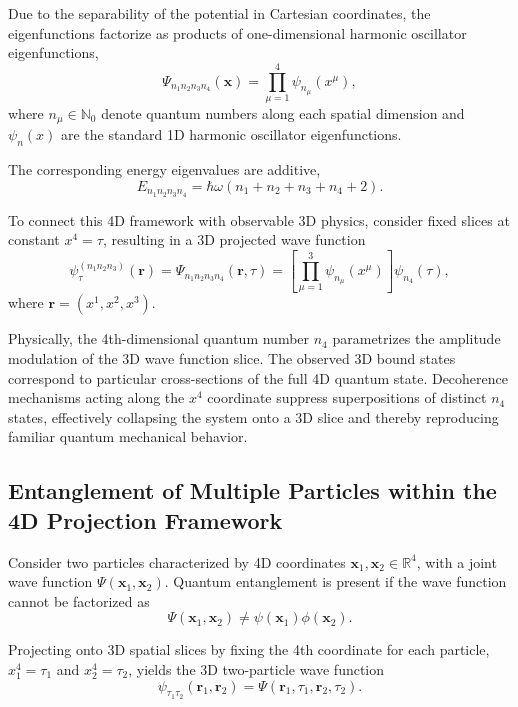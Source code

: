 \documentclass[12pt,a4paper]{article}
\numberwithin{equation}{section}
\begin{document}
Due to the separability of the potential in Cartesian coordinates, the eigenfunctions factorize as products of one-dimensional harmonic oscillator eigenfunctions,
\begin{equation}
    \Psi_{n_1 n_2 n_3 n_4}(\mathbf{x}) = \prod_{\mu=1}^4 \psi_{n_\mu}(x^\mu),
\end{equation}
where \(n_\mu \in \mathbb{N}_0\) denote quantum numbers along each spatial dimension and \(\psi_n(x)\) are the standard 1D harmonic oscillator eigenfunctions.

The corresponding energy eigenvalues are additive,
\begin{equation}
    E_{n_1 n_2 n_3 n_4} = \hbar \omega \left( n_1 + n_2 + n_3 + n_4 + 2 \right).
\end{equation}

To connect this 4D framework with observable 3D physics, consider fixed slices at constant \(x^4 = \tau\), resulting in a 3D projected wave function
\begin{equation}
    \psi_{\tau}^{(n_1 n_2 n_3)}(\mathbf{r}) = \Psi_{n_1 n_2 n_3 n_4}(\mathbf{r}, \tau) = \left[\prod_{\mu=1}^3 \psi_{n_\mu}(x^\mu) \right] \psi_{n_4}(\tau),
\end{equation}
where \(\mathbf{r} = (x^1, x^2, x^3)\).

Physically, the 4th-dimensional quantum number \(n_4\) parametrizes the amplitude modulation of the 3D wave function slice. The observed 3D bound states correspond to particular cross-sections of the full 4D quantum state. Decoherence mechanisms acting along the \(x^4\) coordinate suppress superpositions of distinct \(n_4\) states, effectively collapsing the system onto a 3D slice and thereby reproducing familiar quantum mechanical behavior.

\subsection{Entanglement of Multiple Particles within the 4D Projection Framework}

Consider two particles characterized by 4D coordinates \(\mathbf{x}_1, \mathbf{x}_2 \in \mathbb{R}^4\), with a joint wave function \(\Psi(\mathbf{x}_1, \mathbf{x}_2)\). Quantum entanglement is present if the wave function cannot be factorized as
\begin{equation}
    \Psi(\mathbf{x}_1, \mathbf{x}_2) \neq \psi(\mathbf{x}_1) \phi(\mathbf{x}_2).
\end{equation}

Projecting onto 3D spatial slices by fixing the 4th coordinate for each particle, \(x_1^4 = \tau_1\) and \(x_2^4 = \tau_2\), yields the 3D two-particle wave function
\begin{equation}
    \psi_{\tau_1 \tau_2}(\mathbf{r}_1, \mathbf{r}_2) = \Psi(\mathbf{r}_1, \tau_1, \mathbf{r}_2, \tau_2).
\end{equation}
\end{document}
